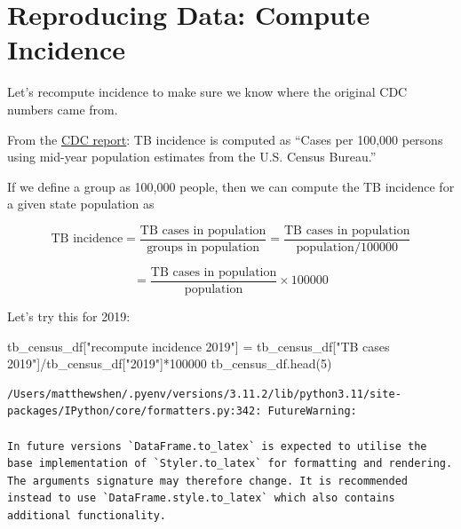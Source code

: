 \documentclass[
  letterpaper,
  DIV=11,
  numbers=noendperiod]{scrreprt}
\newenvironment{Shaded}{\begin{snugshade}}{\end{snugshade}}
\newcommand{\DecValTok}[1]{\textcolor[rgb]{0.68,0.00,0.00}{#1}}
\newcommand{\NormalTok}[1]{\textcolor[rgb]{0.00,0.23,0.31}{#1}}
\newcommand{\OperatorTok}[1]{\textcolor[rgb]{0.37,0.37,0.37}{#1}}
\newcommand{\StringTok}[1]{\textcolor[rgb]{0.13,0.47,0.30}{#1}}
\begin{document}
\hypertarget{reproducing-data-compute-incidence}{%
\section{Reproducing Data: Compute
Incidence}\label{reproducing-data-compute-incidence}}

Let's recompute incidence to make sure we know where the original CDC
numbers came from.

From the
\href{https://www.cdc.gov/mmwr/volumes/71/wr/mm7112a1.htm?s_cid=mm7112a1_w\#T1_down}{CDC
report}: TB incidence is computed as ``Cases per 100,000 persons using
mid-year population estimates from the U.S. Census Bureau.''

If we define a group as 100,000 people, then we can compute the TB
incidence for a given state population as

\[\text{TB incidence} = \frac{\text{TB cases in population}}{\text{groups in population}} = \frac{\text{TB cases in population}}{\text{population}/100000} \]

\[= \frac{\text{TB cases in population}}{\text{population}} \times 100000\]

Let's try this for 2019:

\begin{Shaded}
\begin{Highlighting}[]
\NormalTok{tb\_census\_df[}\StringTok{"recompute incidence 2019"}\NormalTok{] }\OperatorTok{=}\NormalTok{ tb\_census\_df[}\StringTok{"TB cases 2019"}\NormalTok{]}\OperatorTok{/}\NormalTok{tb\_census\_df[}\StringTok{"2019"}\NormalTok{]}\OperatorTok{*}\DecValTok{100000}
\NormalTok{tb\_census\_df.head(}\DecValTok{5}\NormalTok{)}
\end{Highlighting}
\end{Shaded}

\begin{verbatim}
/Users/matthewshen/.pyenv/versions/3.11.2/lib/python3.11/site-packages/IPython/core/formatters.py:342: FutureWarning:

In future versions `DataFrame.to_latex` is expected to utilise the base implementation of `Styler.to_latex` for formatting and rendering. The arguments signature may therefore change. It is recommended instead to use `DataFrame.style.to_latex` which also contains additional functionality.
\end{verbatim}
\end{document}
